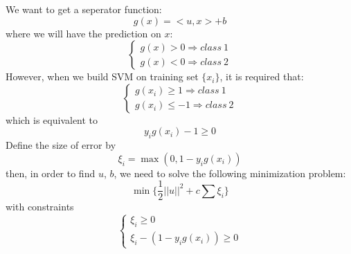 \documentclass{article}
\begin{document}
We want to get a seperator function:
\begin{equation*}
 g(x) = <u,x> + b
\end{equation*}
where we will have the prediction on $x$:
\begin{equation*}
  \begin{cases}
   g(x) > 0 \Longrightarrow class \ 1\\
   g(x) < 0 \Longrightarrow class \ 2
  \end{cases}
\end{equation*}
However, when we build SVM on training set $\{x_{i}\}$, it is required that:
\begin{equation*}
  \begin{cases}
   g(x_{i}) \geq 1 \Longrightarrow class \ 1\\
   g(x_{i}) \leq -1 \Longrightarrow class \ 2
  \end{cases}
\end{equation*}
which is equivalent to
\begin{equation*}
  y_{i}g(x_{i})-1 \geq 0
\end{equation*}
Define the size of error by
\begin{equation*}
  \xi_{i} = \max(0, 1-y_{i}g(x_{i}))
\end{equation*}
then, in order to find $u$, $b$, we need to solve the following minimization problem:
\begin{equation*}
 \min\{\frac{1}{2}||u||^{2} + c\sum \xi_{i}\}
\end{equation*}
with constraints
\begin{equation*}
 \begin{cases}
  \xi_{i} \geq 0 \\
  \xi_{i}-(1-y_{i}g(x_{i})) \geq 0
 \end{cases}
\end{equation*}
\end{document}
